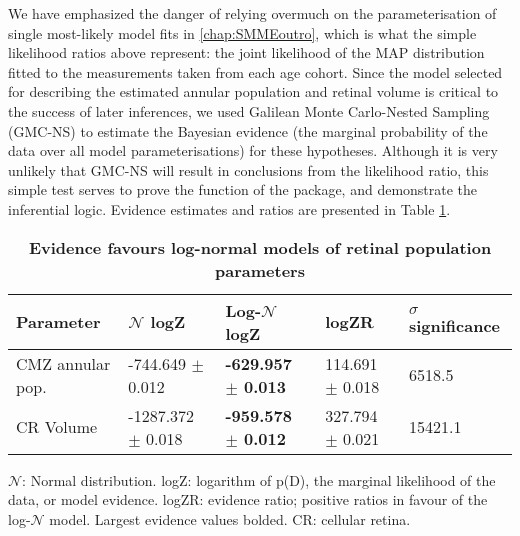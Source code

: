 We have emphasized the danger of relying overmuch on the parameterisation of single most-likely model fits in \autoref{chap:SMMEoutro}, which is what the simple likelihood ratios above represent: the joint likelihood of the MAP distribution fitted to the measurements taken from each age cohort. Since the model selected for describing the estimated annular population and retinal volume is critical to the success of later inferences, we used Galilean Monte Carlo-Nested Sampling (GMC-NS) to estimate the Bayesian evidence (the marginal probability of the data over all model parameterisations) for these hypotheses. Although it is very unlikely that GMC-NS will result in conclusions from the likelihood ratio, this simple test serves to prove the function of the  package, and demonstrate the inferential logic. Evidence estimates and ratios are presented in Table \ref{PZRtable}.

\begin{table}[!ht]
    \centering
    \caption{
    {\bf Evidence favours log-normal models of retinal population parameters}}
    \begin{tabular}{|l|l|l|l|l|}
    \hline
    {\bf Parameter} & {\bf $\mathcal{N}$ logZ} & {\bf Log-$\mathcal{N}$ logZ} & {\bf logZR} & {\bf $\sigma$ significance}\\ \hline
    CMZ annular pop. & -744.649 $\pm$ 0.012 & {\bf -629.957 $\pm$ 0.013} & 114.691 $\pm$ 0.018 & 6518.5\\ \hline
    CR Volume & -1287.372 $\pm$ 0.018 & {\bf -959.578 $\pm$ 0.012} & 327.794 $\pm$ 0.021 & 15421.1\\ \hline
    \end{tabular}
    \begin{flushleft} $\mathcal{N}$: Normal distribution. logZ: logarithm of p(D), the marginal likelihood of the data, or model evidence. logZR: evidence ratio; positive ratios in favour of the log-$\mathcal{N}$ model. Largest evidence values bolded. CR: cellular retina.
    \end{flushleft}
    \label{PZRtable}
\end{table}

